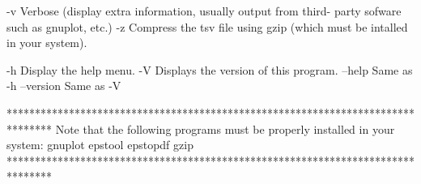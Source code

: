   -v     	Verbose (display extra information, usually output from third-
         	  party sofware such as gnuplot, etc.)
  -z     	Compress the tsv file using gzip (which must be intalled
         	   in your system).

  -h     	Display the help menu.
  -V     	Displays the version of this program.
  --help    		Same as -h
  --version 		Same as -V

********************************************************************************
  Note that the following programs must be properly installed in your system:
                                    gnuplot
                                    epstool
                                    epstopdf
                                      gzip
********************************************************************************
